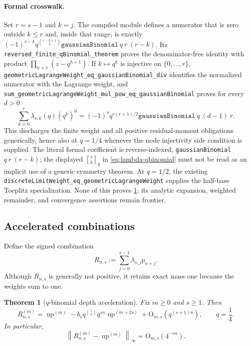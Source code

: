 \documentclass[11pt]{article}
\numberwithin{equation}{section}
\newtheorem{theorem}{Theorem}[section]
\theoremstyle{definition}
\theoremstyle{remark}
\newcommand{\Up}{\operatorname{up}}
\newcommand{\Oh}{\mathrm O}
\newcommand{\qbinom}[3]{\genfrac{[}{]}{0pt}{}{#1}{#2}_{#3}}
\newcommand{\norm}[1]{\left\lVert#1\right\rVert}
\begin{document}
\paragraph{Formal crosswalk.}
Set \(r=s-1\) and \(k=j\).  The compiled module
 defines a numerator that is zero
outside \(k\le r\) and, inside that range, is exactly
\( (-1)^{r-k}q^{\binom{r-k+1}{2}}
\texttt{gaussianBinomial}\ q\ r\ (r-k)\).
Its \texttt{reversed\_finite\_qBinomial\_theorem} proves the
denominator-free identity with product
\(\prod_{h<r}(z-q^{h+1})\).  If \(k\mapsto q^k\) is injective on
\(\{0,\ldots,r\}\),
\texttt{geometricLagrangeWeight\_eq\_gaussianBinomial\_div} identifies
the normalized numerator with the Lagrange weight, and
\texttt{sum\_geometricLagrangeWeight\_mul\_pow\_eq\_gaussianBinomial}
proves for every \(d>0\)
\[
 \sum_{k=0}^{r}\lambda_{s,k}(q)(q^k)^d
 =(-1)^r q^{r(r+1)/2}
   \texttt{gaussianBinomial}\ q\ (d-1)\ r.
\]
This discharges the finite weight and all positive residual-moment
obligations generically, hence also at \(q=1/4\) whenever the node
injectivity side condition is supplied.  The literal formal coefficient is
reverse-indexed, \texttt{gaussianBinomial} \(q\ r\ (r-k)\); the displayed
\(\qbinom{r}{k}{q}\) in \eqref{eq:lambda-qbinomial} must not be read as an
implicit use of a generic symmetry theorem.  At \(q=1/2\), the existing
\texttt{discreteLimitWeight\_eq\_geometricLagrangeWeight} supplies the
half-base Toeplitz specialization.  None of this proves
\cref{thm:q-richardson}: its analytic expansion, weighted remainder, and
convergence assertions remain frontier.

\subsection{Accelerated combinations}

Define the signed combination
\begin{equation}
 R_{n,s}:=\sum_{j=0}^{s-1}\lambda_{s,j}p_{n+j}.
 \label{eq:Rns}
\end{equation}
Although $R_{n,s}$ is generally not positive, it retains exact mass one because the weights sum to one.

\begin{theorem}[$q$-binomial depth acceleration]
\label{thm:q-richardson}
Fix $m\ge0$ and $s\ge1$.  Then
\begin{equation}
 \boxed{
 R_{n,s}^{(m)}
 =\Up^{(m)}
 -b_sq^{\binom s2}q^{sn}\Up^{(m+2s)}
 +\Oh_{m,s}(q^{(s+1)n}),
 \qquad q=\frac14.}
 \label{eq:q-richardson-asymptotic}
\end{equation}
In particular,
\begin{equation}
 \norm{R_{n,s}^{(m)}-\Up^{(m)}}_\infty=\Oh_{m,s}(4^{-sn}).
 \label{eq:q-richardson-rate}
\end{equation}
\end{theorem}
\end{document}
